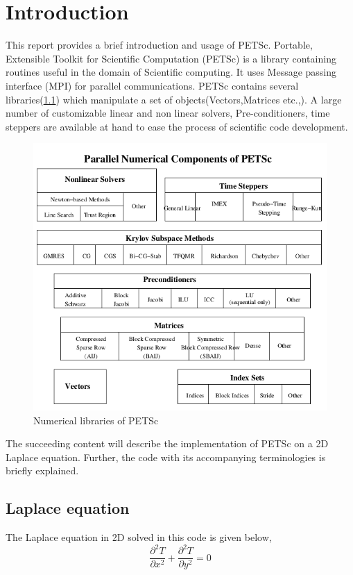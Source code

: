 \chapter{Introduction}
\hspace{0.25cm}This report provides a brief introduction and usage of PETSc. Portable, Extensible Toolkit for Scientific Computation (PETSc) is a library containing routines useful in the domain of Scientific computing. It uses Message passing interface (MPI) for parallel communications. PETSc contains several libraries(\ref{fig:lib}) which manipulate a set of objects(Vectors,Matrices etc.,). A large number of customizable linear and non linear solvers, Pre-conditioners, time steppers are available at hand to ease the process of scientific code development. 

\begin{figure}[H]
\centering
\includegraphics[scale=0.4]{report/figures/library.png}
\caption{Numerical libraries of PETSc \cite{petsc}}
\label{fig:lib}
\end{figure}

\hspace{0.25cm} The succeeding content will describe the implementation of PETSc on a 2D Laplace equation. Further, the code with its accompanying terminologies is briefly explained.  


\section{Laplace equation}
\hspace{0.25cm}The Laplace equation in 2D solved in this code is given below,
\begin{equation}\label{eq:uhe}
 \frac{\partial^2 T}{\partial x^2}+\frac{\partial^2 T}{\partial y^2} = 0
\end{equation}

